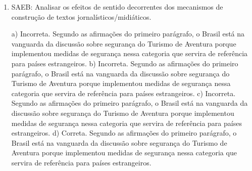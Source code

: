 \begin{enumerate}
\item
SAEB: Analisar os efeitos de sentido decorrentes dos mecanismos de construção
de textos jornalísticos/midiáticos.

a) Incorreta. Segundo as afirmações do primeiro parágrafo, o Brasil está na vanguarda da discussão sobre 
segurança do Turismo de Aventura porque implementou medidas de segurança nessa categoria que servira de
referência para países estrangeiros.
b) Incorreta. Segundo as afirmações do primeiro parágrafo, o Brasil está na vanguarda da discussão sobre 
segurança do Turismo de Aventura porque implementou medidas de segurança nessa categoria que servira de
referência para países estrangeiros.
c) Incorreta. Segundo as afirmações do primeiro parágrafo, o Brasil está na vanguarda da discussão sobre 
segurança do Turismo de Aventura porque implementou medidas de segurança nessa categoria que servira de
referência para países estrangeiros.
d) Correta. Segundo as afirmações do primeiro parágrafo, o Brasil está na vanguarda da discussão sobre 
segurança do Turismo de Aventura porque implementou medidas de segurança nessa categoria que servira de
referência para países estrangeiros.

\end{enumerate}


